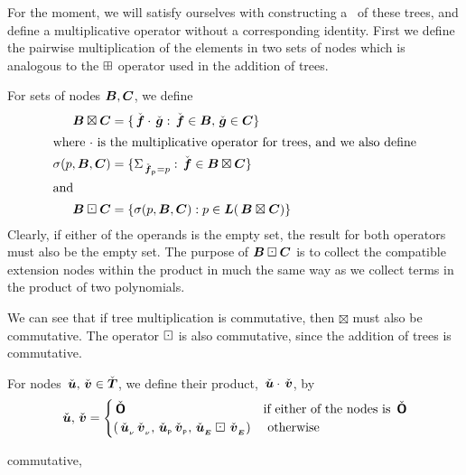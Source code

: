For the moment, we will satisfy ourselves with constructing a \rng\ of
these trees, and define a multiplicative operator without a
corresponding identity. First we define the pairwise multiplication of
the elements in two sets of nodes which is analogous to the $\boxplus$
operator used in the addition of trees.
\begin{definition}\label{treesetmultiplication1} 
  For sets of nodes $\boldsymbol{B}, \boldsymbol{C}$, we define 
  \begin{align*}
    \boldsymbol{B}\boxtimes\boldsymbol{C}&=\{\,\check{\boldsymbol{f}}\cdot\,\check{\boldsymbol{g}}:\,\check{\boldsymbol{f}}\in\boldsymbol{B},\,\check{\boldsymbol{g}}\in\boldsymbol{C}\}\\
    \intertext{where $\cdot$ is the multiplicative operator for trees, and we also define}
    \sigma(p,\boldsymbol{B},\boldsymbol{C})&=\{\Sigma_{{\,\check{\boldsymbol{f}}}{{}_{_{\mathsf{P}}}}=p}:\,\check{\boldsymbol{f}}\in\boldsymbol{B}\boxtimes\boldsymbol{C}\}\\
      \intertext{and}
    \boldsymbol{B}\boxdot\boldsymbol{C}&=\{\sigma(p,\boldsymbol{B},\boldsymbol{C}): p\in\boldsymbol{L}(\,\boldsymbol{\boldsymbol{B}\boxtimes\boldsymbol{C}})\}
  \end{align*}
  Clearly, if either of the operands is the empty set, the result for
  both operators must also be the empty set.  The purpose of
  $\boldsymbol{B}\boxdot\boldsymbol{C}$ is to collect the compatible extension nodes
  within the product in much the same way as we collect terms in the
  product of two polynomials.

  We can see that if tree multiplication is commutative, then
  $\boxtimes$ must also be commutative. The operator $\boxdot$ is also
  commutative, since the addition of trees is commutative.
\end{definition}


\begin{definition}\label{treemultiplication} 
For nodes $\,\check{\boldsymbol{u}}, \,\check{\boldsymbol{v}} \in \check{\boldsymbol{T}}$, we define their product,
$\,\check{\boldsymbol{u}} \cdot \,\check{\boldsymbol{v}}$, by
\begin{equation}
  \,\check{\boldsymbol{u}}, \,\check{\boldsymbol{v}} = \begin{cases}
    \,\check{\boldsymbol{\mathsf{O}}} & \text{if either of the nodes is } \,\check{\boldsymbol{\mathsf{O}}} \\
    ({\,\check{\boldsymbol{u}}}{{}_{_{\nu}}}{\,\check{\boldsymbol{v}}}{{}_{_{\nu}}}, {\,\check{\boldsymbol{u}}}{{}_{_{\mathsf{P}}}}{\,\check{\boldsymbol{v}}}{{}_{_{\mathsf{P}}}},{\,\check{\boldsymbol{u}}}{{}_{_{\boldsymbol{E}}}}\boxdot{\,\check{\boldsymbol{v}}}{{}_{_{\boldsymbol{E}}}}) & \text{ otherwise} \\
  \end{cases}
\end{equation}

commutative, 
\end{definition}

